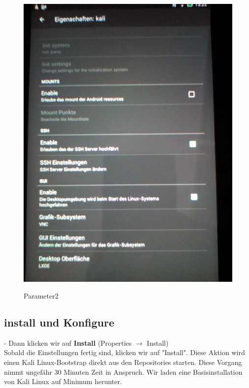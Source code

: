 \documentclass[11pt,a4paper]{article}
\begin{document}
\begin{figure}[H]
\begin{center} \includegraphics[scale=0.1]{./Image/img3}  \\
\caption{Parameter2}
\end{center}
\end{figure} 

\subsection{install und Konfigure}

- Dann klicken wir auf \textbf{Install} (Properties $\rightarrow$ Install) \\
Sobald die Einstellungen fertig sind, klicken wir auf "Install". Diese Aktion wird einen Kali Linux-Bootstrap direkt aus den Repositories starten. Diese Vorgang nimmt ungefähr 30 Minuten Zeit in Anspruch. Wir laden eine Basisinstallation von Kali Linux auf Minimum herunter. \\ 
\end{document}
